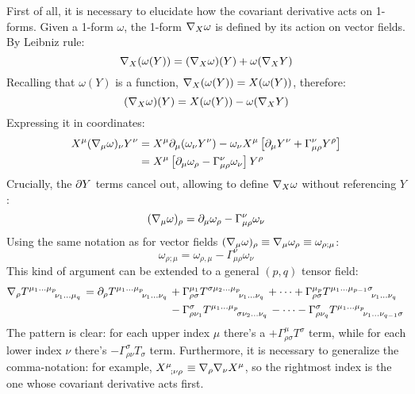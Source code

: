 First of all, it is necessary to elucidate how the covariant derivative acts on 1-forms. Given a 1-form $ \omega $, the 1-form $ \nabla_X \omega $ is defined by its action on vector fields. By Leibniz rule:
\begin{equation*}
  \nabla_X (\omega(Y)) = (\nabla_X \omega)(Y) + \omega(\nabla_X Y)
\end{equation*}
Recalling that $ \omega(Y) $ is a function, $ \nabla_X (\omega(Y)) = X(\omega(Y)) $, therefore:
\begin{equation}
  (\nabla_X \omega)(Y) = X(\omega(Y)) - \omega(\nabla_X Y)
  \label{eq:3.27}
\end{equation}
Expressing it in coordinates:
\begin{equation*}
  \begin{split}
    X^\mu (\nabla_\mu \omega)_\nu Y^\nu
    &= X^\mu \partial_\mu (\omega_\nu Y^\nu) - \omega_\nu X^\mu \left[ \partial_\mu Y^\nu + \Gamma^\nu_{\mu \rho} Y^\rho \right] \\
    &= X^\mu \left[ \partial_\mu \omega_\rho - \Gamma^\nu_{\mu \rho} \omega_{\nu} \right] Y^\rho
  \end{split}
\end{equation*}
Crucially, the $ \partial Y $ terms cancel out, allowing to define $ \nabla_X \omega $ without referencing $ Y $:
\begin{equation}
  (\nabla_\mu \omega)_\rho = \partial_\mu \omega_\rho - \Gamma^\nu_{\mu \rho} \omega_\nu
  \label{eq:3.28}
\end{equation}
Using the same notation as for vector fields $ (\nabla_\mu \omega)_\rho \equiv \nabla_\mu \omega_\rho \equiv \omega_{\rho ; \mu} $:
\begin{equation}
  \omega_{\rho ;\mu} = \omega_{\rho,\mu} - \Gamma^\nu_{\mu \rho} \omega_\nu
  \label{eq:3.29}
\end{equation}
This kind of argument can be extended to a general $ (p,q) $ tensor field:
\begin{equation}
  \begin{split}
    \na_\rho \tensor{T}{^{\mu_1} ^\dots ^{\mu_p} _{\nu_1} _\dots _{\mu_q}} = \pa_\rho \tensor{T}{^{\mu_1} ^\dots ^{\mu_p} _{\nu_1} _\dots _{\nu_q}}
    &+ \Gamma^{\mu_1}_{\rho \sigma} \tensor{T}{^\sigma ^{\mu_2} ^\dots ^{\mu_p} _{\nu_1} _\dots _{\nu_q}} + \dots + \Gamma^{\mu_p}_{\rho \sigma} \tensor{T}{^{\mu_1} ^\dots ^{\mu_{p-1}} ^\sigma _{\nu_1} _\dots _{\nu_q}} \\
    &- \Gamma^\sigma_{\rho \nu_1} \tensor{T}{^{\mu_1} ^\dots ^{\mu_p} _\sigma _{\nu_2} _\dots _{\nu_q}} - \dots - \Gamma^\sigma_{\rho \nu_q} \tensor{T}{^{\mu_1} ^\dots ^{\mu_p} _{\nu_1} _\dots _{\nu_{q-1}} _\sigma}
  \end{split}
  \label{eq:3.30}
\end{equation}
The pattern is clear: for each upper index $ \mu $ there's a $ + \Gamma^\mu_{\rho \sigma} T^\sigma $ term, while for each lower index $ \nu $ there's $ - \Gamma^\sigma_{\rho \nu} T_\sigma $ term. Furthermore, it is necessary to generalize the comma-notation: for example, $ \tensor{X}{^\mu _; _\nu _\rho} \equiv \na_\rho \na_\nu X^\mu $, so the rightmost index is the one whose covariant derivative acts first.

